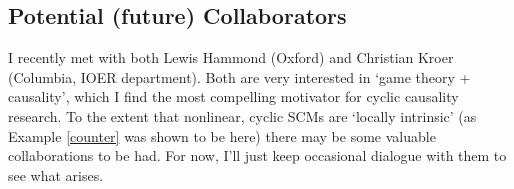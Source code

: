 \documentclass[letterpaper,10pt]{article}
\begin{document}
\subsection{Potential (future) Collaborators}

I recently met with both Lewis Hammond (Oxford) and Christian Kroer (Columbia, IOER department). Both are very interested in `game theory + causality', which I find the most compelling motivator for cyclic causality research. To the extent that nonlinear, cyclic SCMs are `locally intrinsic' (as Example \ref{counter} was shown to be here) there may be some valuable collaborations to be had. For now, I'll just keep occasional dialogue with them to see what arises.




\end{document}

